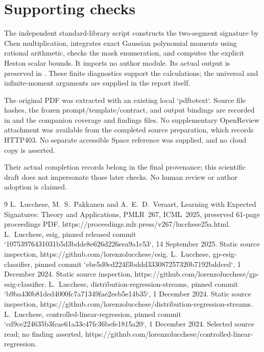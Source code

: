 \documentclass[10pt]{article}
\begin{document}
\section*{Supporting checks}
The independent standard-library script constructs the two-segment signature by Chen multiplication, integrates exact Gaussian polynomial moments using rational arithmetic, checks the mask enumeration, and computes the explicit Heston scalar bounds. It imports no author module. Its actual output is preserved in . These finite diagnostics support the calculations; the universal and infinite-moment arguments are supplied in the report itself.\par
The original PDF was extracted with an existing local `pdftotext`. Source file hashes, the frozen prompt/template/contract, and output bindings are recorded in and the companion coverage and findings files. No supplementary OpenReview attachment was available from the completed source preparation, which records HTTP403. No separate accessible Space reference was supplied, and no cloud copy is asserted.\par
Their actual completion records belong in the final provenance; this scientific draft does not impersonate those later checks. No human review or author adoption is claimed.\par
9 L. Lucchese, M. S. Pakkanen and A. E. D. Veraart, Learning with Expected Signatures: Theory and Applications, PMLR 267, ICML 2025, preserved 61-page proceedings PDF, https://proceedings.mlr.press/v267/lucchese25a.html. L. Lucchese, esig, pinned released commit `10753976431031b5d3bdde8e626d226eea9a1c53`, 14 September 2025. Static source inspection, https://github.com/lorenzolucchese/esig. L. Lucchese, gp-esig-classifier, pinned commit `ebe5d0cd224f3bddd333087257320b7192bddced`, 1 December 2024. Static source inspection, https://github.com/lorenzolucchese/gp-esig-classifier. L. Lucchese, distribution-regression-streams, pinned commit `b9ba430b81ded4000fc7a71349fae2eeb5e14b35`, 1 December 2024. Static source inspection, https://github.com/lorenzolucchese/distribution-regression-streams. L. Lucchese, controlled-linear-regression, pinned commit `cd9ce224635b3fcae61a33c47fc36befe1815a20`, 1 December 2024. Selected source read; no finding asserted, https://github.com/lorenzolucchese/controlled-linear-regression.\par
\end{document}
